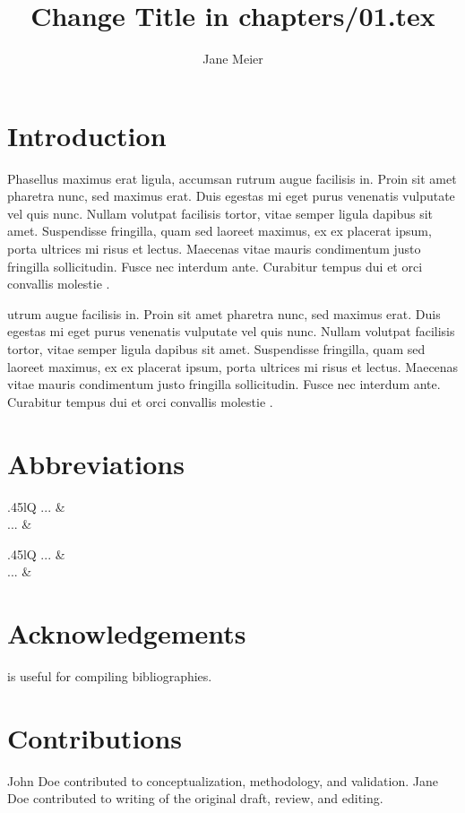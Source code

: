 \documentclass[output=paper,colorlinks,citecolor=brown]{langscibook}
\title{Change Title in chapters/01.tex}
\author{Jane Meier\orcid{}\affiliation{University of Eden}}
\begin{document}
\maketitle

\section{Introduction} 
Phasellus maximus erat ligula, accumsan rutrum augue facilisis in. Proin sit amet pharetra nunc, sed maximus erat. Duis egestas mi eget purus venenatis vulputate vel quis nunc. Nullam volutpat facilisis tortor, vitae semper ligula dapibus sit amet. Suspendisse fringilla, quam sed laoreet maximus, ex ex placerat ipsum, porta ultrices mi risus et lectus. Maecenas vitae mauris condimentum justo fringilla sollicitudin. Fusce nec interdum ante. Curabitur tempus dui et orci convallis molestie \citep{Comrie1981}.
 
 utrum augue facilisis in. Proin sit amet pharetra nunc, sed maximus erat. Duis egestas mi eget purus venenatis vulputate vel quis nunc. Nullam volutpat facilisis tortor, vitae semper ligula dapibus sit amet. Suspendisse fringilla, quam sed laoreet maximus, ex ex placerat ipsum, porta ultrices mi risus et lectus. Maecenas vitae mauris condimentum justo fringilla sollicitudin. Fusce nec interdum ante. Curabitur tempus dui et orci convallis molestie \citep{Chomsky1957}.

  
\section*{Abbreviations}
\begin{tabularx}{.45\textwidth}{lQ}
... & \\
... & \\
\end{tabularx}
\begin{tabularx}{.45\textwidth}{lQ}
... & \\
... & \\
\end{tabularx}


\section*{Acknowledgements}
\citet{Nordhoff2018} is useful for compiling bibliographies.

\section*{Contributions}
John Doe contributed to conceptualization, methodology, and validation.
Jane Doe contributed to writing of the original draft, review, and editing.
\end{document}
